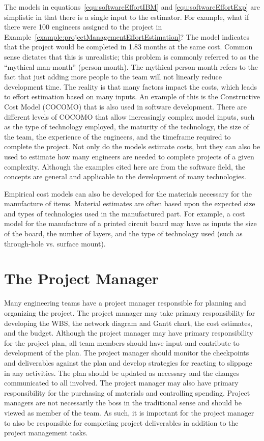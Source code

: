 The models in 
equations~\ref{equ:softwareEffortIBM} and \ref{equ:softwareEffortExp}
 are simplistic in that there is a single input
to the estimator. For example, what if there were 100 engineers assigned
to the project in Example~\ref{example:projectManagementEffortEstimation}? 
The model indicates that the project
would be completed in 1.83 months at the same cost. Common sense
dictates that this is unrealistic; this problem is commonly referred to
as the ``mythical man-month'' (person-month). The mythical person-month
refers to the fact that just adding more people to the team will not
linearly reduce development time. The reality is that many factors
impact the costs, which leads to effort estimation based on many inputs.
An example of this is the Constructive Cost Model (COCOMO) that is also
used in software development. There are different levels of COCOMO that
allow increasingly complex model inputs, such as the type of technology
employed, the maturity of the technology, the size of the team, the
experience of the engineers, and the timeframe required to complete the
project. Not only do the models estimate costs, but they can also be
used to estimate how many engineers are needed to complete projects of a
given complexity. Although the examples cited here are from the software
field, the concepts are general and applicable to the development of
many technologies.

Empirical cost models can also be developed for the materials necessary
for the manufacture of items. Material estimates are often based upon
the expected size and types of technologies used in the manufactured
part. For example, a cost model for the manufacture of a printed circuit
board may have as inputs the size of the board, the number of layers,
and the type of technology used (such as through-hole vs. surface
mount).

\section{The Project Manager}
\label{section:the-project-manager}

Many engineering teams have a project manager responsible for planning
and organizing the project. The project manager may take primary
responsibility for developing the WBS, the network diagram and Gantt
chart, the cost estimates, and the budget. Although the project manager
may have primary responsibility for the project plan, all team members
should have input and contribute to development of the plan. The project
manager should monitor the checkpoints and deliverables against the plan
and develop strategies for reacting to slippage in any activities. The
plan should be updated as necessary and the changes communicated to all
involved. The project manager may also have primary responsibility for
the purchasing of materials and controlling spending. Project managers
are not necessarily the boss in the traditional sense and should be
viewed as member of the team. As such, it is important for the project
manager to also be responsible for completing project deliverables in
addition to the project management tasks.


